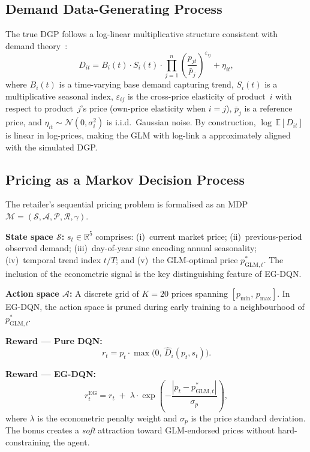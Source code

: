 \documentclass[journal, 10pt, twoside]{IEEEtran}
\begin{document}
\subsection{Demand Data-Generating Process}

The true DGP follows a log-linear multiplicative structure consistent
with demand theory~\cite{kopalle2023, zhang2025}:
\begin{equation}
  D_{it} = B_i(t)\cdot S_i(t)\cdot
  \prod_{j=1}^{n}\!\left(\frac{p_{jt}}{\bar{p}_j}\right)^{\!\varepsilon_{ij}}
  + \eta_{it},
  \label{eq:dgp}
\end{equation}
where $B_i(t)$ is a time-varying base demand capturing trend, $S_i(t)$
is a multiplicative seasonal index, $\varepsilon_{ij}$ is the cross-price
elasticity of product~$i$ with respect to product~$j$'s price
(own-price elasticity when $i=j$), $\bar{p}_j$ is a reference price, and
$\eta_{it}\sim\mathcal{N}(0,\sigma_i^2)$ is i.i.d.\ Gaussian noise.
By construction, $\log\,\mathbb{E}[D_{it}]$ is linear in log-prices,
making the GLM with log-link a approximately aligned with the simulated DGP.

\subsection{Pricing as a Markov Decision Process}

The retailer's sequential pricing problem is formalised as an MDP
$\mathcal{M} = (\mathcal{S}, \mathcal{A}, \mathcal{P}, \mathcal{R},
\gamma)$.

\smallskip\noindent\textbf{State space $\mathcal{S}$:}
$s_t \in \mathbb{R}^5$ comprises:
(i)~current market price;
(ii)~previous-period observed demand;
(iii)~day-of-year sine encoding annual seasonality;
(iv)~temporal trend index $t/T$; and
(v)~the GLM-optimal price $p^*_{\text{GLM},t}$.
The inclusion of the econometric signal is the key distinguishing feature
of EG-DQN.

\smallskip\noindent\textbf{Action space $\mathcal{A}$:}
A discrete grid of $K=20$ prices spanning
$[p_{\min},\,p_{\max}]$. In EG-DQN, the action space is pruned during
early training to a neighbourhood of $p^*_{\text{GLM},t}$.

\smallskip\noindent\textbf{Reward --- Pure DQN:}
\begin{equation}
  r_t = p_t \cdot \max\!\bigl(0,\,\hat{D}_i(p_t, s_t)\bigr).
  \label{eq:reward_dqn}
\end{equation}

\smallskip\noindent\textbf{Reward --- EG-DQN:}
\begin{equation}
  r_t^{\text{EG}} = r_t \;+\;
  \lambda\cdot\exp\!\!\left(-\frac{|p_t - p^*_{\text{GLM},t}|}{\sigma_p}\right),
  \label{eq:reward_egdqn}
\end{equation}
where $\lambda$ is the econometric penalty weight and $\sigma_p$ is the
price standard deviation. The bonus creates a \emph{soft} attraction
toward GLM-endorsed prices without hard-constraining the agent.
\end{document}
